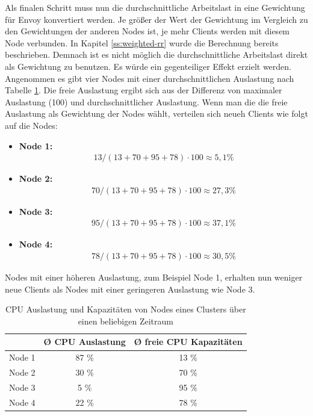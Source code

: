 Als finalen Schritt muss nun die durchschnittliche Arbeitslast in eine Gewichtung für Envoy konvertiert werden. Je grö{\ss}er der Wert der Gewichtung im Vergleich zu den Gewichtungen der anderen Nodes ist, je mehr Clients werden mit diesem Node verbunden. In Kapitel \ref{ss:weighted-rr} wurde die Berechnung bereits beschrieben. Demnach ist es nicht möglich die durchschnittliche Arbeitslast direkt als Gewichtung zu benutzen. Es würde ein gegenteiliger Effekt erzielt werden.
Angenommen es gibt vier Nodes mit einer durchschnittlichen Auslastung nach Tabelle \ref{table:example-cluster-cpu}. Die freie Auslastung ergibt sich aus der Differenz von maximaler Auslastung (100) und durchschnittlicher Auslastung. Wenn man die die freie Auslastung als Gewichtung der Nodes wählt, verteilen sich neueh Clients wie folgt auf die Nodes:
\begin{itemize}
  \item \textbf{Node 1:}
    \begin{align}
      13 / (13 + 70 + 95 + 78) \cdot 100 \approx 5,1 \%
    \end{align}
  \item \textbf{Node 2:}
    \begin{align}
      70 / (13 + 70 + 95 + 78) \cdot 100 \approx 27,3 \%
    \end{align}
  \item \textbf{Node 3:}
    \begin{align}
      95 / (13 + 70 + 95 + 78) \cdot 100 \approx 37,1 \%
    \end{align}
  \item \textbf{Node 4:}
    \begin{align}
      78 / (13 + 70 + 95 + 78) \cdot 100 \approx 30,5 \%
    \end{align}
\end{itemize}
Nodes mit einer höheren Auslastung, zum Beispiel Node 1, erhalten nun weniger neue Clients als Nodes mit einer geringeren Auslastung wie Node 3.
\\
\begin{table}[h!]
\centering
\renewcommand{\arraystretch}{1.5}
\begin{tabular}{|l|c|c|}
    \hline
    & \textbf{Ø CPU Auslastung} & \textbf{Ø freie CPU Kapazitäten} \\
    \hline
    \hline
    Node 1 & 87 \% & 13 \% \\
    \hline
    Node 2 & 30 \% & 70 \% \\
    \hline
    Node 3 & 5 \% & 95 \% \\
    \hline
    Node 4 & 22 \% & 78 \% \\
    \hline
\end{tabular}
\caption{CPU Auslastung und Kapazitäten von Nodes eines Clusters über einen beliebigen Zeitraum}
\label{table:example-cluster-cpu}
\end{table}
